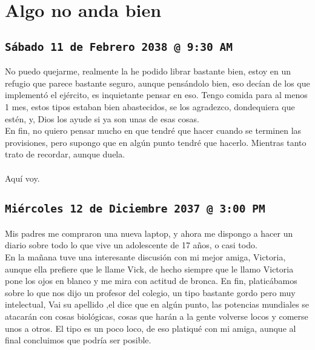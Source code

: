 \chapter{Algo no anda bien}
\vspace*{1.5cm}
\section*{\texttt{Sábado 11 de Febrero 2038 @ 9:30 AM}}
\vspace*{1.5cm}

No puedo quejarme, realmente la he podido librar bastante bien, estoy en un refugio que parece bastante 
seguro, aunque pensándolo bien, eso decían de los que implementó el ejército, es inquietante pensar en eso.
Tengo comida para al menos 1 mes, estos tipos estaban bien abastecidos, se los agradezco, dondequiera que 
estén, y, Dios los ayude si ya son unas de esas cosas.\\
En fin, no quiero pensar mucho en que tendré que hacer cuando se terminen las provisiones, pero supongo que 
en algún punto tendré que hacerlo.
Mientras tanto trato de recordar, aunque duela.\\\\
Aquí voy.
\newpage

\vspace*{1.5cm}
\section*{\texttt{Miércoles 12 de Diciembre 2037 @ 3:00 PM}}
\vspace*{1.5cm}
Mis padres me compraron una nueva laptop, y ahora me dispongo a hacer un diario sobre todo lo que vive un 
adolescente de 17 años, o casi todo.\\
En la mañana tuve una interesante discusión con mi mejor amiga, Victoria, aunque ella prefiere que le llame
Vick, de hecho siempre que le llamo Victoria pone los ojos en blanco y me mira con actitud de bronca. En fin, platicábamos sobre lo que nos dijo un profesor del colegio, un tipo bastante gordo pero muy intelectual, 
Vai su apellido ,el dice que en algún punto, las potencias mundiales se atacarán con cosas biológicas, cosas que harán a la gente volverse locos y comerse unos a otros. El tipo es un poco loco, de eso platiqué con mi amiga, aunque al final concluimos que podría ser posible.\\\\

\vspace*{1.5cm}
